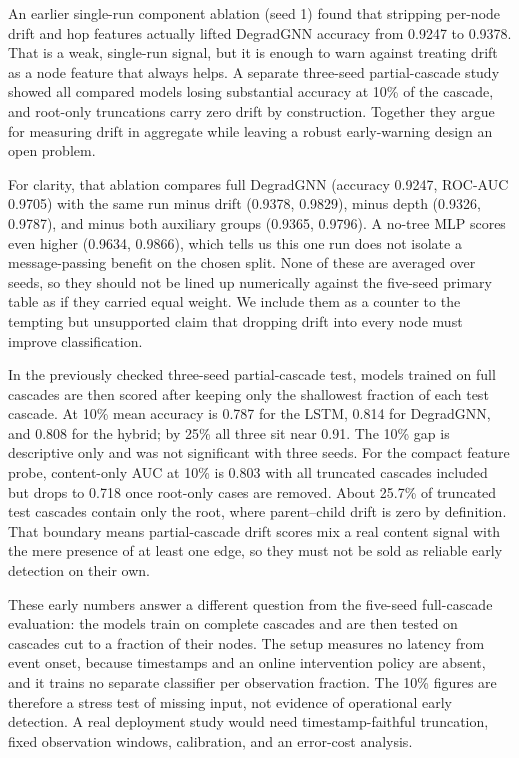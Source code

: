 \documentclass[conference]{IEEEtran}
\begin{document}
An earlier single-run component ablation (seed 1) found that stripping per-node
drift and hop features actually lifted DegradGNN accuracy from 0.9247 to 0.9378.
That is a weak, single-run signal, but it is enough to warn against treating
drift as a node feature that always helps. A separate three-seed partial-cascade
study showed all compared models losing substantial accuracy at 10\% of the
cascade, and root-only truncations carry zero drift by construction. Together
they argue for measuring drift in aggregate while leaving a robust early-warning
design an open problem.

For clarity, that ablation compares full DegradGNN (accuracy 0.9247, ROC-AUC
0.9705) with the same run minus drift (0.9378, 0.9829), minus depth (0.9326,
0.9787), and minus both auxiliary groups (0.9365, 0.9796). A no-tree MLP scores
even higher (0.9634, 0.9866), which tells us this one run does not isolate a
message-passing benefit on the chosen split. None of these are averaged over
seeds, so they should not be lined up numerically against the five-seed primary
table as if they carried equal weight. We include them as a counter to the
tempting but unsupported claim that dropping drift into every node must improve
classification.

In the previously checked three-seed partial-cascade test, models trained on
full cascades are then scored after keeping only the shallowest fraction of each
test cascade. At 10\% mean accuracy is 0.787 for the LSTM, 0.814 for DegradGNN,
and 0.808 for the hybrid; by 25\% all three sit near 0.91. The 10\% gap is
descriptive only and was not significant with three seeds. For the compact
feature probe, content-only AUC at 10\% is 0.803 with all truncated cascades
included but drops to 0.718 once root-only cases are removed. About 25.7\% of
truncated test cascades contain only the root, where parent--child drift is
zero by definition. That boundary means partial-cascade drift scores mix a real
content signal with the mere presence of at least one edge, so they must not be
sold as reliable early detection on their own.

These early numbers answer a different question from the five-seed full-cascade
evaluation: the models train on complete cascades and are then tested on
cascades cut to a fraction of their nodes. The setup measures no latency from
event onset, because timestamps and an online intervention policy are absent,
and it trains no separate classifier per observation fraction. The 10\% figures
are therefore a stress test of missing input, not evidence of operational early
detection. A real deployment study would need timestamp-faithful truncation,
fixed observation windows, calibration, and an error-cost analysis.
\end{document}

